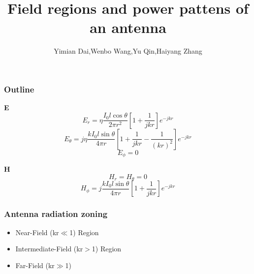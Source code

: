 \documentclass[compress=true]{beamer}
\title{Field regions and power pattens of an antenna}
\author{\tiny{Yimian Dai,Wenbo Wang,Yu Qin,Haiyang Zhang}}
\institute{http://dspandlinux.com}
\begin{document}
\begin{frame}
\titlepage
\end{frame}
\begin{frame}
  \frametitle{Outline}
  \begin{block}{\bf E}
    $$E_r = \eta\frac{I_0l\cos{\theta}}{2\pi r^2}[1+\frac{1}{jkr}]e^{-jkr}$$
    $$E_{\theta} = j\eta\frac{kI_0l\sin{\theta}}{4\pi r}[1+\frac{1}{jkr}-\frac{1}{(kr)^2}]e^{-jkr}$$
    $$E_{\phi}=0$$
  \end{block}
  \begin{block}{\bf H}
    $$H_r=H_{\theta}=0$$
    $$H_{\phi}=j\frac{kI_0l\sin{\theta}}{4\pi r}[1+\frac{1}{jkr}]e^{-jkr}$$
  \end{block}
\end{frame}
\begin{frame}
  \frametitle{Antenna radiation zoning}
  \begin{itemize}
    \item Near-Field (kr$\ll$1) Region
    \item Intermediate-Field (kr$>$1) Region
    \item Far-Field (kr$\gg$1)
  \end{itemize}
\end{frame}
\end{document}
